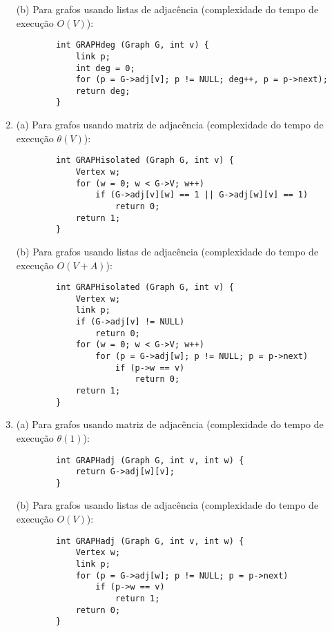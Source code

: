 \documentclass[12pt,letterpaper]{article}
\begin{document}
\begin{enumerate}
    \subitem (b) Para grafos usando listas de adjacência (complexidade do tempo de execução $O(V)$):
    \begin{lstlisting}
        int GRAPHdeg (Graph G, int v) {
            link p;
            int deg = 0;
            for (p = G->adj[v]; p != NULL; deg++, p = p->next);
            return deg;
        }
    \end{lstlisting}
    
    \item
    \subitem (a) Para grafos usando matriz de adjacência (complexidade do tempo de execução $\theta(V)$):
    \begin{lstlisting}
        int GRAPHisolated (Graph G, int v) {
            Vertex w;
            for (w = 0; w < G->V; w++)
                if (G->adj[v][w] == 1 || G->adj[w][v] == 1)
                    return 0;
            return 1;
        }
    \end{lstlisting}
    
    \subitem (b) Para grafos usando listas de adjacência (complexidade do tempo de execução $O(V + A)$):
    \begin{lstlisting}
        int GRAPHisolated (Graph G, int v) {
            Vertex w;
            link p;
            if (G->adj[v] != NULL)
                return 0;
            for (w = 0; w < G->V; w++)
                for (p = G->adj[w]; p != NULL; p = p->next)
                    if (p->w == v)
                        return 0;
            return 1;
        }
    \end{lstlisting}
    
    \item
    \subitem (a) Para grafos usando matriz de adjacência (complexidade do tempo de execução $\theta(1)$):
    \begin{lstlisting}
        int GRAPHadj (Graph G, int v, int w) {
            return G->adj[w][v];
        }
    \end{lstlisting}
    
    \clearpage
    
    \subitem (b) Para grafos usando listas de adjacência (complexidade do tempo de execução $O(V)$):
    \begin{lstlisting}
        int GRAPHadj (Graph G, int v, int w) {
            Vertex w;
            link p;
            for (p = G->adj[w]; p != NULL; p = p->next)
                if (p->w == v)
                    return 1;
            return 0;
        }
    \end{lstlisting}
    

\end{enumerate}
\end{document}
